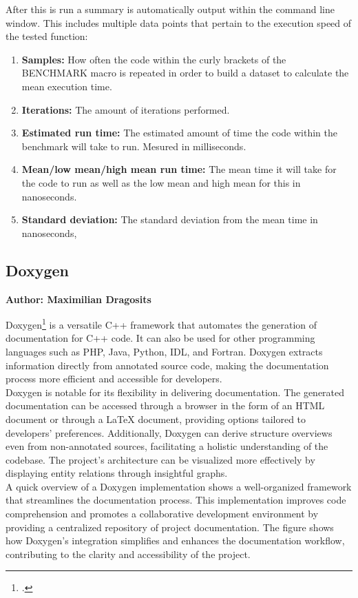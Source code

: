 After this is run a summary is automatically output within the command line window. This includes multiple data points that pertain to the execution speed of the tested
function:
\begin{enumerate}
    \item \textbf{Samples:} How often the code within the curly brackets of the BENCHMARK macro is repeated in order to build a dataset to calculate the mean execution time.
    \item \textbf{Iterations:} The amount of iterations performed.
    \item \textbf{Estimated run time:} The estimated amount of time the code within the benchmark will take to run. Mesured in milliseconds.
    \item \textbf{Mean/low mean/high mean run time:} The mean time it will take for the code to run as well as the low mean and high mean for this in nanoseconds.
    \item \textbf{Standard deviation:} The standard deviation from the mean time in nanoseconds,
\end{enumerate}

\subsection{Doxygen}
\textbf{Author: Maximilian Dragosits}

Doxygen\footcite{doxygen_main_site} is a versatile C++ framework that automates the generation of documentation for C++ code. It can also be used for other programming languages such as 
PHP, Java, Python, IDL, and Fortran. Doxygen extracts information directly from annotated source code, making the documentation process more efficient and 
accessible for developers.\\

Doxygen is notable for its flexibility in delivering documentation. The generated documentation can be accessed through a browser in the form of an HTML document or  
through a LaTeX document, providing options tailored to developers' preferences. Additionally, Doxygen can derive structure overviews even from non-annotated 
sources, facilitating a holistic understanding of the codebase. The project's architecture can be visualized more effectively by displaying entity relations 
through insightful graphs.\\

A quick overview of a Doxygen implementation shows a well-organized framework that streamlines the documentation process. This implementation improves code 
comprehension and promotes a collaborative development environment by providing a centralized repository of project documentation. The figure shows how Doxygen's 
integration simplifies and enhances the documentation workflow, contributing to the clarity and accessibility of the project.\\

